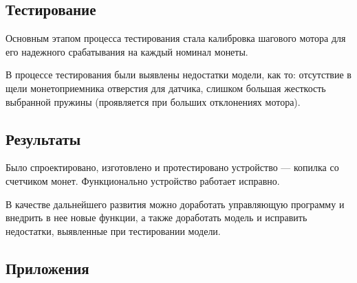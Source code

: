 \subsection {Тестирование}

Основным этапом процесса тестирования стала калибровка шагового мотора для его надежного срабатывания на каждый номинал монеты.

В процессе тестирования были выявлены недостатки модели, как то: отсутствие в щели монетоприемника отверстия для датчика, слишком большая жесткость выбранной пружины (проявляется при больших отклонениях мотора).

\subsection {Результаты}

Было спроектировано, изготовлено и протестировано устройство — копилка со счетчиком монет. Функционально устройство работает исправно.

В качестве дальнейшего развития можно доработать управляющую программу и внедрить в нее новые функции, а также доработать модель и исправить недостатки, выявленные при тестировании модели.

\subsection{Приложения}
